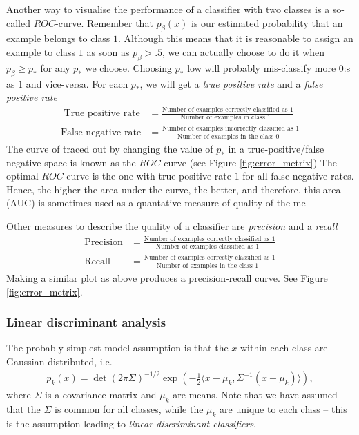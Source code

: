 \documentclass{article}
\newcommand{\sprod}[1]{\langle #1 \rangle}
\begin{document}
Another way to visualise the performance of a classifier with two classes is a so-called $ROC$-curve. Remember that $p_{\beta}(x)$ is our estimated probability that an example belongs to class $1$. Although this means that it is reasonable to assign an example to class $1$ as soon as $p_\beta>.5$, we can actually choose to do it when $p_\beta \geq p_*$ for any $p_*$ we choose. Choosing $p_*$ low will probably mis-classify more $0$:s as $1$ and vice-versa. For each $p_*$, we will get a \emph{true positive rate} and a \emph{false positive rate}
\begin{align*}
    \text{ True positive rate}&= \frac{\text{Number of examples correctly classified as $1$}}{\text{Number of examples in class $1$ }} \\
    \text{False negative rate}&= \frac{\text{Number of examples incorrectly classified as $1$}}{\text{Number of examples in the class $0$ }}
\end{align*}
The curve of traced out by changing the value of $p_*$ in a true-positive/false negative space is known as the $ROC$ curve (see Figure \ref{fig:error_metrix}) The optimal $ROC$-curve is the one with true positive rate $1$ for all false negative rates. Hence, the higher the area under the curve, the better, and therefore, this area (AUC) is sometimes used as a quantative measure of quality of the me

Other measures to describe the quality of a classifier are 
\emph{precision} and a \emph{recall}
\begin{align*}
    \text{Precision}&= \frac{\text{Number of examples correctly classified as $1$}}{\text{Number of examples classified as $1$ }} \\
    \text{Recall}&= \frac{\text{Number of examples correctly classified as $1$}}{\text{Number of examples in the class $1$ }}
\end{align*}
Making a similar plot as above produces a precision-recall curve. See Figure \ref{fig:error_metrix}.

\subsubsection{Linear discriminant analysis}  The probably simplest model assumption is that the $x$ within each class are Gaussian distributed, i.e.
\begin{align*}
    p_k(x) = \det(2\pi\Sigma)^{-1/2} \exp( -\tfrac{1}{2}\sprod{x-\mu_k,\Sigma^{-1}(x-\mu_k)}),
\end{align*}
where $\Sigma$ is a covariance matrix and $\mu_k$ are means. Note that we have assumed that the $\Sigma$ is common for all classes, while the $\mu_k$ are unique to each class -- this is the assumption leading to \emph{linear discriminant classifiers}.
\end{document}
